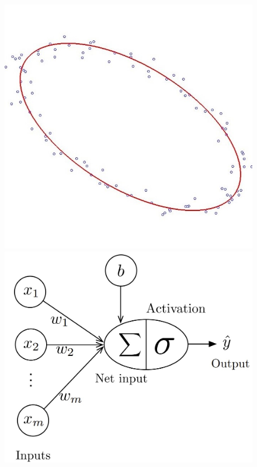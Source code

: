    \begin{figure}[H]
        \centering
        \begin{minipage}[H]{0.42\textwidth}
            \includegraphics[width=\textwidth]{images/ellipse_acceuil.jpg}
        \end{minipage}
        \hfill
        \begin{minipage}[H]{0.42\textwidth}
            \includegraphics[width=\textwidth]{images/perceptron.jpg}
        \end{minipage}
    \end{figure}
